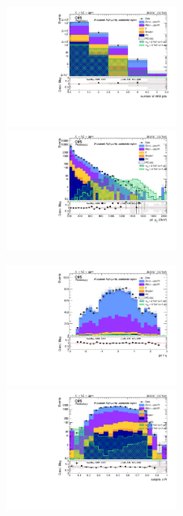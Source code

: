 \begin{figure}[!htb]
  \begin{center}
    \includegraphics[width=0.495\textwidth]{plots/v9_U/XVZnnhpSB/nFatJets.pdf}  
    \includegraphics[width=0.495\textwidth]{plots/v9_U/XVZnnhpSB/FatJet1_pt.pdf}
    
    \includegraphics[width=0.495\textwidth]{plots/v9_U/XVZnnhpSB/FatJet1_eta.pdf}
    \includegraphics[width=0.495\textwidth]{plots/v9_U/XVZnnhpSB/FatJet1_dR.pdf}


\end{center}
\end{figure}
